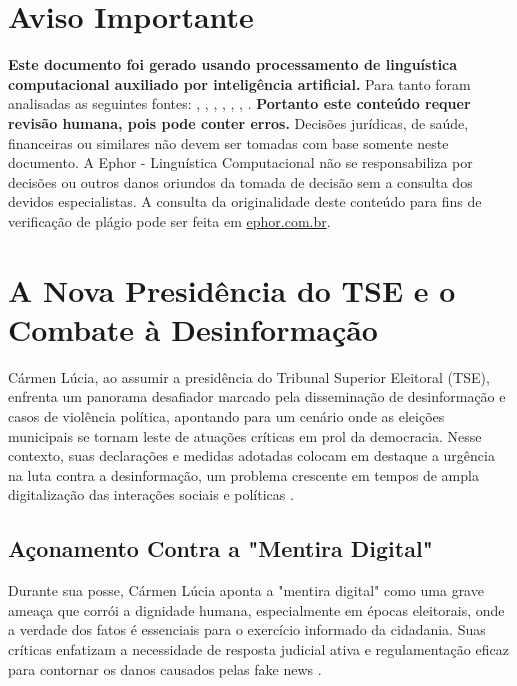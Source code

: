 \documentclass[
   article,       
   12pt,          
   oneside,       
   a4paper,       
   english,       
   brazil,        
   sumario=tradicional
   ]{abntex2}
\begin{document}
\frenchspacing 
\maketitle

\textual
\section{Aviso Importante}
\textbf{Este documento foi gerado usando processamento de linguística computacional auxiliado por inteligência artificial.} Para tanto foram analisadas as seguintes fontes:  \cite{As_duas_preocupacoes_que_rondam_Carmen_Lucia_}, \cite{Carmen_Lucia_tem_de_afastar_TSE_da_polarizaca}, \cite{Carmen_Lucia_toma_posse_na_presidencia_do_TSE}, \cite{Contra_o_virus_da_mentira_ha_o_remedio_da_inf}, \cite{Mendonca_e_o_unico_ministro_do_STF_a_faltar_a}, \cite{Pacheco_participa_da_posse_na_Carmen_Lucia_na}, \cite{Quem_centraliza_poderes_em_uma_pessoa_chamase}.
\textbf{Portanto este conteúdo requer revisão humana, pois pode conter erros.} Decisões jurídicas, de saúde, financeiras ou similares não devem ser tomadas com base somente neste documento. A Ephor - Linguística Computacional não se responsabiliza por decisões ou outros danos oriundos da tomada de decisão sem a consulta dos devidos especialistas.
A consulta da originalidade deste conteúdo para fins de verificação de plágio pode ser feita em \href{http://www.ephor.com.br}{ephor.com.br}.

\section{A Nova Presidência do TSE e o Combate à Desinformação}
Cármen Lúcia, ao assumir a presidência do Tribunal Superior Eleitoral (TSE), enfrenta um panorama desafiador marcado pela disseminação de desinformação e casos de violência política, apontando para um cenário onde as eleições municipais se tornam leste de atuações críticas em prol da democracia. Nesse contexto, suas declarações e medidas adotadas colocam em destaque a urgência na luta contra a desinformação, um problema crescente em tempos de ampla digitalização das interações sociais e políticas \cite{Carmen_Lucia_toma_posse_na_presidencia_do_TSE}.

\subsection{Açonamento Contra a "Mentira Digital"}
Durante sua posse, Cármen Lúcia aponta a "mentira digital" como uma grave ameaça que corrói a dignidade humana, especialmente em épocas eleitorais, onde a verdade dos fatos é essenciais para o exercício informado da cidadania. Suas críticas enfatizam a necessidade de resposta judicial ativa e regulamentação eficaz para contornar os danos causados pelas fake news \cite{Contra_o_virus_da_mentira_ha_o_remedio_da_inf}.
\end{document}
